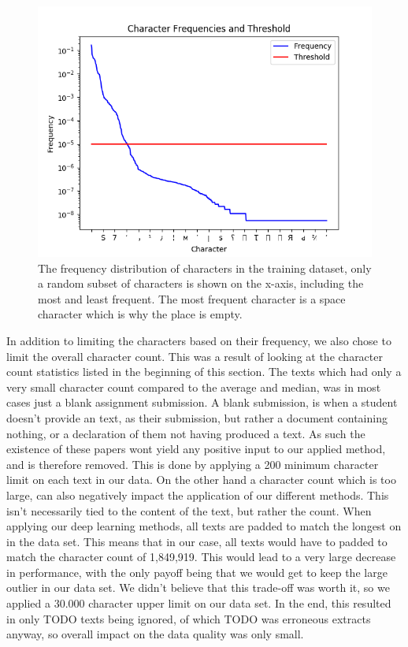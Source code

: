 \begin{figure}[htb]
    \centering
    \includegraphics[scale=.8]{./pictures/data/character_frequencies.png}
    \caption{The frequency distribution of characters in the training dataset,
        only a random subset of characters is shown on the x-axis, including the
        most and least frequent. The most frequent character is a space
        character which is why the place is empty.}
    \label{fig:character_frequencies}
\end{figure}

In addition to limiting the characters based on their frequency, we also chose
to limit the overall character count. This was a result of looking at the
character count statistics listed in the beginning of this section. The texts
which had only a very small character count compared to the average and median,
was in most cases just a blank assignment submission. A blank submission, is
when a student doesn't provide an text, as their submission, but rather a
document containing nothing, or a declaration of them not having produced a
text. As such the existence of these papers wont yield any positive input to
our applied method, and is therefore removed. This is done by applying a 200
minimum character limit on each text in our data. On the other hand a character
count which is too large, can also negatively impact the application of our
different methods. This isn't necessarily tied to the content of the text, but
rather the count. When applying our deep learning methods, all texts are padded
to match the longest on in the data set. This means that in our case, all texts
would have to padded to match the character count of 1,849,919. This would lead
to a very large decrease in performance, with the only payoff being that we
would get to keep the large outlier in our data set. We didn't believe that this
trade-off was worth it, so we applied a 30.000 character upper limit on our data
set. In the end, this resulted in only TODO texts being ignored, of which TODO
was erroneous extracts anyway, so overall impact on the data quality was only
small.

